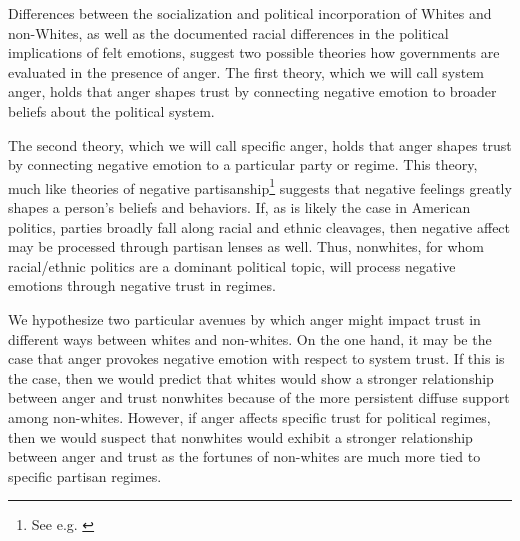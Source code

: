 \documentclass[12t, letterpaper]{article}
\begin{document}
Differences between the socialization and political incorporation of Whites and non-Whites, as well as the documented racial differences in the political implications of felt emotions, suggest two possible theories how governments are evaluated in the presence of anger. The first theory, which we will call system anger, holds that anger shapes trust by connecting negative emotion to broader beliefs about the political system. 

The second theory, which we will call specific anger, holds that anger shapes trust by connecting negative emotion to a particular party or regime. This theory, much like theories of negative partisanship\footnote{See e.g. \cite{abramowitz2016}} suggests that negative feelings greatly shapes a person's beliefs and behaviors. If, as is likely the case in American politics, parties broadly fall along racial and ethnic cleavages, then negative affect may be processed through partisan lenses as well. Thus, nonwhites, for whom racial/ethnic politics are a dominant political topic, will process negative emotions through negative trust in regimes.

We hypothesize two particular avenues by which anger might impact trust in different ways between whites and non-whites. On the one hand, it may be the case that anger provokes negative emotion with respect to system trust. If this is the case, then we would predict that whites would show a stronger relationship between anger and trust nonwhites because of the more persistent diffuse support among non-whites. However, if anger affects specific trust for political regimes, then we would suspect that nonwhites would exhibit a stronger relationship between anger and trust as the fortunes of non-whites are much more tied to specific partisan regimes.


\end{document}
